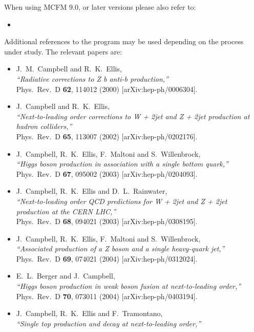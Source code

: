 When using MCFM 9.0, or later versions please also refer to:
\begin{itemize}
	\item {}
\end{itemize}

Additional references to the program may be used depending on the process under study. The relevant papers are:
\begin{itemize}
\item J.~M.~Campbell and R.~K.~Ellis, \\
  {\it ``Radiative corrections to Z b anti-b production,''} \\
  Phys.\ Rev.\ D {\bf 62}, 114012 (2000)
  [arXiv:hep-ph/0006304].
\item J.~Campbell and R.~K.~Ellis, \\
  {\it ``Next-to-leading order corrections to W + 2jet and Z + 2jet production  at
   hadron colliders,''} \\
  Phys.\ Rev.\ D {\bf 65}, 113007 (2002)
  [arXiv:hep-ph/0202176].
\item J.~Campbell, R.~K.~Ellis, F.~Maltoni and S.~Willenbrock, \\
  {\it ``Higgs boson production in association with a single bottom quark,''} \\
  Phys.\ Rev.\ D {\bf 67}, 095002 (2003)
  [arXiv:hep-ph/0204093].
\item J.~Campbell, R.~K.~Ellis and D.~L.~Rainwater, \\
  {\it ``Next-to-leading order QCD predictions for W + 2jet and Z + 2jet  production
     at the CERN LHC,''} \\
  Phys.\ Rev.\ D {\bf 68}, 094021 (2003)
  [arXiv:hep-ph/0308195].
\item J.~Campbell, R.~K.~Ellis, F.~Maltoni and S.~Willenbrock, \\
  {\it ``Associated production of a Z boson and a single heavy-quark jet,''} \\
  Phys.\ Rev.\ D {\bf 69}, 074021 (2004)
  [arXiv:hep-ph/0312024].
\item E.~L.~Berger and J.~Campbell, \\
  {\it ``Higgs boson production in weak boson fusion at next-to-leading order,''} \\
  Phys.\ Rev.\ D {\bf 70}, 073011 (2004)
  [arXiv:hep-ph/0403194].
\item J.~Campbell, R.~K.~Ellis and F.~Tramontano, \\
  {\it ``Single top production and decay at next-to-leading order,''} \\

\end{itemize}
